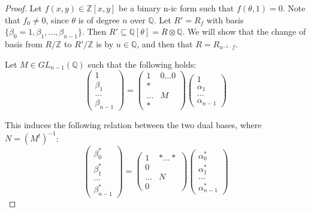\documentclass{report}
\begin{document}
\begin{proof}
Let $f(x,y) \in \mathbb{Z}[x,y]$ be a binary n-ic form such that $f(\theta,1) = 0$.  Note that $f_0 \neq 0$, since $\theta$ is of degree $n$ over $\mathbb{Q}$.  Let $R' = R_f$ with basis $\{\beta_0 = 1, \beta_1, \ldots, \beta_{n-1} \}$.  Then $R' \subseteq \mathbb{Q}[\theta] = R \otimes \mathbb{Q}$.  We will show that the change of basis from $R / \mathbb{Z}$ to $R' / \mathbb{Z}$ is by $u \in \mathbb{Q}$, and then that $R = R_{u^{-1} \cdot f}$.

Let $M \in GL_{n-1}(\mathbb{Q})$ such that the following holds:
\begin{equation}
\begin{pmatrix} 1 \\ \beta_1 \\ \ldots \\ \beta_{n-1} \end{pmatrix} = \begin{pmatrix} 1 & 0 \ldots 0 \\ * & \\ \ldots & M \\ * & \end{pmatrix} \begin{pmatrix} 1 \\ \alpha_1 \\ \ldots \\ \alpha_{n-1} \end{pmatrix}
\end{equation}

This induces the following relation between the two dual bases, where $N = (M^t)^{-1}$:
\begin{equation}
\begin{pmatrix} \beta_0^* \\ \beta_1^* \\ \ldots \\ \beta_{n-1}^* \end{pmatrix} = \begin{pmatrix} 1 & * \ldots * \\ 0 & \\ \ldots & N \\ 0 & \end{pmatrix} \begin{pmatrix} \alpha_0^* \\ \alpha_1^* \\ \ldots \\ \alpha_{n-1}^* \end{pmatrix}
\end{equation}


\end{proof}
\end{document}
